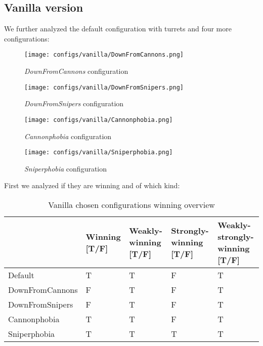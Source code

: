 \documentclass[
10pt, %
a4paper, %
oneside, %
headinclude,footinclude, %
BCOR5mm, %
]{scrartcl}
\begin{document}
		\subsection{Vanilla version}
			We further analyzed the default configuration with turrets and four more configurations:
			\begin{figure}[h!]
				\centering
				\begin{minipage}{.4\textwidth}
					\centering
					\texttt{[image: configs/vanilla/DownFromCannons.png]}
					\caption{\emph{DownFromCannons} configuration}
				\end{minipage}
				\begin{minipage}{.5\textwidth}
					\centering
					\texttt{[image: configs/vanilla/DownFromSnipers.png]}
					\caption{\emph{DownFromSnipers} configuration}
				\end{minipage}
			\end{figure}
			\begin{figure}[h!]
				\centering
				\begin{minipage}{.4\textwidth}
					\centering
					\texttt{[image: configs/vanilla/Cannonphobia.png]}
					\caption{\emph{Cannonphobia} configuration}
				\end{minipage}
				\begin{minipage}{.5\textwidth}
					\centering
					\texttt{[image: configs/vanilla/Sniperphobia.png]}
					\caption{\emph{Sniperphobia} configuration}
				\end{minipage}
			\end{figure}

			First we analyzed if they are winning and of which kind:
			\begin{table}[h!]
				\centering
				\begin{tabularx}{\textwidth}{||X|>{\raggedright\arraybackslash}X|>{\raggedright\arraybackslash}X|>{\raggedright\arraybackslash}X|>{\raggedright\arraybackslash}X||}
					\hline
					& Winning [T/F] & Weakly-winning [T/F] & Strongly-winning [T/F] & Weakly-strongly-winning [T/F] \\
					\hline
					Default 		& T & T & F & T \\ \hline
					DownFromCannons & F & T & F & T \\ \hline
					DownFromSnipers & F & T & F & T \\ \hline
					Cannonphobia 	& T & T & F & T \\ \hline
					Sniperphobia 	& T & T & T & T \\ \hline
				\end{tabularx}
				\caption{Vanilla chosen configurations winning overview}
			\end{table}
			
\end{document}
